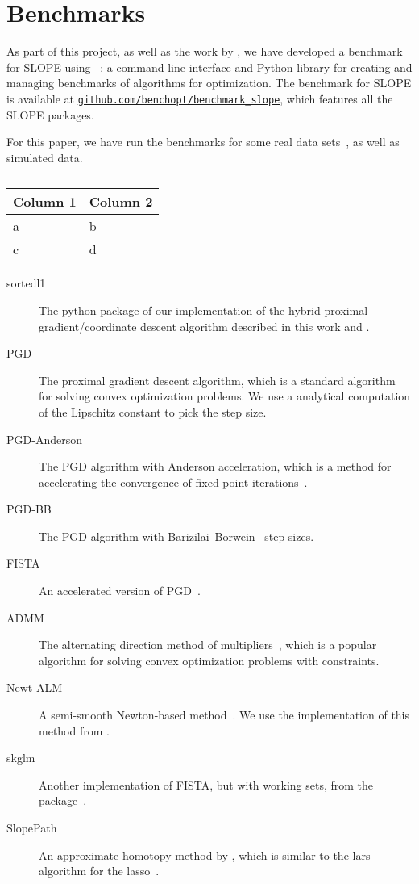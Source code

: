 \documentclass[article]{jss}
\let\Cref\crtCref
\newcommand{\myurl}[1]{\href{https://#1}{\nolinkurl{#1}}}
\begin{document}
\section{Benchmarks}

As part of this project, as well as the work by \citet{larsson2023}, we have
developed a benchmark for SLOPE using ~\citep{moreau2022a}: a
command-line interface and Python library for creating and managing
benchmarks of algorithms for optimization. The benchmark for
SLOPE is available at \myurl{github.com/benchopt/benchmark\_slope}, which
features all the SLOPE packages.

For this paper, we have run the benchmarks for some real data sets~\Cref{tab:real-datasets},
as well as simulated data.

\begin{table}[htpb]
  \centering
  \caption{}
  \label{tab:real-datasets}
  \begin{tabular}{ll}
    \toprule
    Column 1 & Column 2 \\
    \midrule
    a        & b        \\
    c        & d        \\
    \bottomrule
  \end{tabular}
\end{table}

\begin{description}
  \item[sortedl1] The python package of our implementation of the hybrid
        proximal gradient/coordinate descent algorithm described in this work and
        \citet{larsson2023}.
  \item[PGD] The proximal gradient descent algorithm, which is a standard
        algorithm for solving convex optimization problems. We use a
        analytical computation of the Lipschitz constant to pick the step size.
  \item[PGD-Anderson] The PGD algorithm with Anderson acceleration, which is a
        method for accelerating the convergence of fixed-point
        iterations~\citep{anderson1965,zhang2020}.
  \item[PGD-BB] The PGD algorithm with Barizilai--Borwein~\citep{barzilai1988} step sizes.
  \item[FISTA] An accelerated version of PGD~\citep{beck2009}.
  \item[ADMM] The alternating direction method of
        multipliers~\citep{glowinski1975,boyd2010}, which is a popular algorithm
        for solving convex optimization problems with constraints.
  \item[Newt-ALM] A semi-smooth Newton-based method~\citep{luo2019}. We use the
        implementation of this method from \citet{larsson2023}.
  \item[skglm] Another implementation of FISTA, but with working sets, from the
         package~\citep{bertrand2022}.
  \item[SlopePath] An approximate homotopy method by \citet{dupuis2024},
        which is similar to the lars algorithm for the lasso~\citep{efron2004}.
\end{description}



\newpage

\begin{appendix}

\end{appendix}
\end{document}
